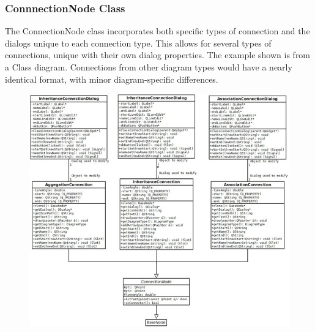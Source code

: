 \documentclass[twoside,letterpaper]{article}
\begin{document}
{\subsubsection[\ ConnectionNode Class ]
{\bfseries ConnnectionNode Class }
{
The ConnectionNode class incorporates both specific types of connection and the dialogs unique to each connection type. This allows for several types of connections, unique with their own dialog properties. \newline
The example shown is from a Class diagram. Connections from other diagram types would have a nearly identical format, with minor diagram-specific differences.
}
  \begin{figure}[h]
  \centering
  \includegraphics[width=6.5in]{class_connectionnode.jpeg}
  \end{figure}

\clearpage
}
\end{document}
